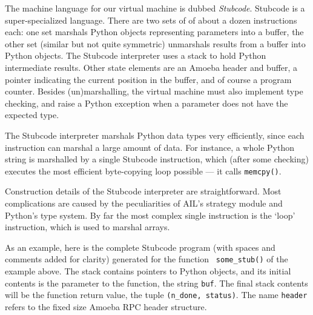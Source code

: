 The machine language for our virtual machine is dubbed {\em Stubcode}.
Stubcode is a super-specialized language.  There are two sets of of
about a dozen instructions each: one set marshals Python objects
representing parameters into a buffer, the other set (similar but not
quite symmetric) unmarshals results from a buffer into Python objects.
The Stubcode interpreter uses a stack to hold Python intermediate
results.  Other state elements are an Amoeba header and buffer, a
pointer indicating the current position in the buffer, and of course a
program counter.  Besides (un)marshalling, the virtual machine must
also implement type checking, and raise a Python exception when a
parameter does not have the expected type.

The Stubcode interpreter marshals Python data types very efficiently,
since each instruction can marshal a large amount of data.  For
instance, a whole Python string is marshalled by a single Stubcode
instruction, which (after some checking) executes the most efficient
byte-copying loop possible --- it calls {\tt memcpy()}.


Construction details of the Stubcode interpreter are straightforward.
Most complications are caused by the peculiarities of AIL's strategy
module and Python's type system.  By far the most complex single
instruction is the `loop' instruction, which is used to marshal
arrays.

As an example, here is the complete Stubcode program (with spaces and
comments added for clarity) generated for the function {\tt
some\_stub()} of the example above.  The stack contains pointers to
Python objects, and its initial contents is the parameter to the
function, the string {\tt buf}.  The final stack contents will be the
function return value, the tuple {\tt (n\_done, status)}.  The name
{\tt header} refers to the fixed size Amoeba RPC header structure.
\vspace{1em}

